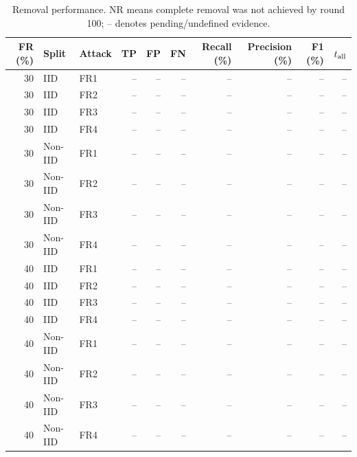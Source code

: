 \begin{table}[t]
\centering\footnotesize\setlength{\tabcolsep}{4pt}
\caption{Removal performance. NR means complete removal was not achieved by round 100; -- denotes pending/undefined evidence.}\label{tab:detection}
\begin{tabular}{rllrrrrrrr}
\toprule
FR (\%) & Split & Attack & TP & FP & FN & Recall (\%) & Precision (\%) & F1 (\%) & $t_{\rm all}$ \\
\midrule
30 & IID & FR1 & -- & -- & -- & -- & -- & -- & -- \\
30 & IID & FR2 & -- & -- & -- & -- & -- & -- & -- \\
30 & IID & FR3 & -- & -- & -- & -- & -- & -- & -- \\
30 & IID & FR4 & -- & -- & -- & -- & -- & -- & -- \\
30 & Non-IID & FR1 & -- & -- & -- & -- & -- & -- & -- \\
30 & Non-IID & FR2 & -- & -- & -- & -- & -- & -- & -- \\
30 & Non-IID & FR3 & -- & -- & -- & -- & -- & -- & -- \\
30 & Non-IID & FR4 & -- & -- & -- & -- & -- & -- & -- \\
40 & IID & FR1 & -- & -- & -- & -- & -- & -- & -- \\
40 & IID & FR2 & -- & -- & -- & -- & -- & -- & -- \\
40 & IID & FR3 & -- & -- & -- & -- & -- & -- & -- \\
40 & IID & FR4 & -- & -- & -- & -- & -- & -- & -- \\
40 & Non-IID & FR1 & -- & -- & -- & -- & -- & -- & -- \\
40 & Non-IID & FR2 & -- & -- & -- & -- & -- & -- & -- \\
40 & Non-IID & FR3 & -- & -- & -- & -- & -- & -- & -- \\
40 & Non-IID & FR4 & -- & -- & -- & -- & -- & -- & -- \\
\bottomrule
\end{tabular}
\end{table}

